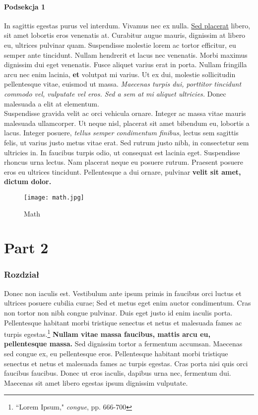 \documentclass[12pt,a4paper]{article}
\begin{document}
	\subsection{Podsekcja 1}
	\label{Podsekcja 1}
	In sagittis egestas purus vel interdum. Vivamus nec ex nulla. \underline{Sed placerat}  libero, sit amet lobortis eros venenatis at. Curabitur augue mauris, dignissim at libero eu, ultrices pulvinar quam. Suspendisse molestie lorem ac tortor efficitur, eu semper ante tincidunt. Nullam hendrerit et lacus nec venenatis. Morbi maximus dignissim dui eget venenatis. Fusce aliquet varius erat in porta. Nullam fringilla arcu nec enim lacinia, \textbf{et} volutpat mi varius. Ut ex dui, molestie sollicitudin pellentesque vitae, euismod ut massa. \textit{Maecenas turpis dui, porttitor tincidunt commodo vel, vulputate vel eros. Sed a sem at mi aliquet ultricies.} Donec malesuada a elit at elementum. \\Suspendisse gravida velit ac orci vehicula ornare. Integer ac massa vitae mauris malesuada ullamcorper. Ut neque nisl, placerat sit amet bibendum eu, lobortis a lacus. Integer posuere, \textit{tellus semper condimentum finibus}, lectus sem sagittis felis, ut varius justo metus vitae erat. Sed rutrum justo nibh, in consectetur sem ultricies in. In faucibus turpis odio, ut consequat est lacinia eget. Suspendisse rhoncus urna lectus. Nam placerat neque eu posuere rutrum. Praesent posuere eros eu ultrices tincidunt. Pellentesque a dui ornare, pulvinar  \textbf{velit sit amet, dictum dolor.}
	\begin{figure}[H]
		\centering
		\texttt{[image: math.jpg]}
		\caption{Math}
		\label{fig: Math}
	\end{figure}
	
	\part{Part 2}
	\section{Rozdział}

	Donec non iaculis est. Vestibulum ante ipsum primis in faucibus orci luctus et ultrices posuere cubilia curae; Sed et metus eget enim auctor condimentum. Cras non tortor non nibh congue pulvinar. Duis eget justo id enim iaculis porta. Pellentesque habitant morbi tristique senectus et netus et malesuada fames ac turpis egestas.\footnote{``Lorem Ipsum," \emph{congue}, pp. 666-700} \textbf{Nullam vitae massa faucibus, mattis arcu eu, pellentesque massa.} Sed dignissim tortor a fermentum accumsan. Maecenas sed congue ex, eu pellentesque eros. Pellentesque habitant morbi tristique senectus et netus et malesuada fames ac turpis egestas. Cras porta nisi quis orci faucibus faucibus. Donec ut eros iaculis, dapibus urna nec, fermentum dui. Maecenas sit amet libero egestas ipsum dignissim vulputate. 
 
\end{document}
